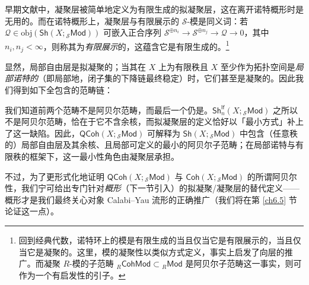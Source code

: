 \begin{Rem}
早期文献中，凝聚层被简单地定义为有限生成的拟凝聚层，这在离开诺特概形时是无用的。而在诺特概形上，凝聚层与有限展示的 $\mathcal{S}$-模是同义词：若 $\mathcal{Q}\in\text{obj}(\mathsf{Sh}(X;{}_\mathcal{S}\mathsf{Mod}))$ 可嵌入正合序列 $\mathcal{S}^{\oplus n_i}\rightarrow\mathcal{S}^{\oplus n_j}\rightarrow \mathcal{Q}\rightarrow 0$，其中 $n_i, n_j<\infty$，则称其为\textit{有限展示}的，这蕴含它是有限生成的。\footnote{回到经典代数，诺特环上的模是有限生成的当且仅当它是有限展示的，当且仅当它是凝聚的。这里，模的凝聚性以类似方式定义，事实上启发了向层的推广。而凝聚 $R$-模的子范畴 ${}_R\mathsf{CohMod}\subset{}_R\mathsf{Mod}$ 是阿贝尔子范畴这一事实，则可作为一个有启发性的引子。}
\end{Rem}

显然，局部自由层是拟凝聚的；当其在 $X$ 上为有限秩且 $X$ 至少作为拓扑空间是\textit{局部诺特的}（即局部地，闭子集的下降链最终稳定）时，它们甚至是凝聚的。因此我们得到如下全包含的范畴链：\vspace*{0.1cm}
\begin{center}
\noindent{}
\end{center}\vspace*{0.3cm}

\noindent 我们知道前两个范畴不是阿贝尔范畴，而最后一个仍是。$\mathsf{Sh}^\mathsf{lf}_n(X;{}_\mathcal{S}\mathsf{Mod})$ 之所以不是阿贝尔范畴，恰在于它不含余核，而拟凝聚层的定义恰好以「最小方式」补上了这一缺陷。因此，$\mathsf{QCoh}(X;{}_\mathcal{S}\mathsf{Mod})$ 可解释为 $\mathsf{Sh}(X;{}_\mathcal{S}\mathsf{Mod})$ 中包含（任意秩的）局部自由层及其余核、且局部可定义的最小的阿贝尔子范畴；在局部诺特与有限秩的框架下，这一最小性角色由凝聚层承担。
\vspace*{0.3cm}

\noindent 不过，为了更形式化地证明 $\mathsf{QCoh}(X;{}_\mathcal{S}\mathsf{Mod})$ 与 $\mathsf{Coh}(X;{}_\mathcal{S}\mathsf{Mod})$ 的所谓阿贝尔性，我们宁可给出专门针对\textit{概形}（下一节引入）的拟凝聚/凝聚层的替代定义——概形才是我们最终关心对象 Calabi--Yau 流形的正确推广（我们将在第 \ref{ch6.5} 节论证这一点）。

